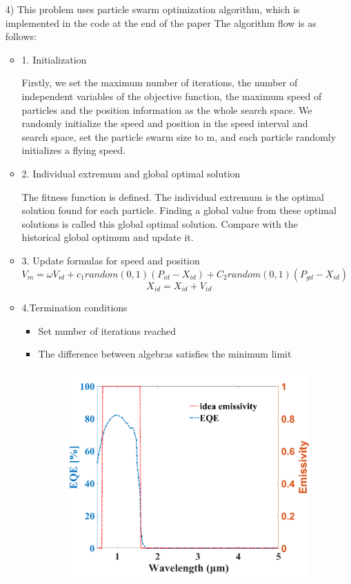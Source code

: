 \documentclass{apmcmthesis}
\begin{document}
\begin{itemize}
\item [4)]This problem uses particle swarm optimization algorithm, which is implemented in the code at the end of the paper
The algorithm flow is as follows:\par
\begin{itemize}
\item 1. Initialization\par
Firstly, we set the maximum number of iterations, the number of independent variables of the objective function, the maximum speed of particles and the position information as the whole search space. We randomly initialize the speed and position in the speed interval and search space, set the particle swarm size to m, and each particle randomly initializes a flying speed.
\item 2. Individual extremum and global optimal solution\par
The fitness function is defined. The individual extremum is the optimal solution found for each particle. Finding a global value from these optimal solutions is called this global optimal solution. Compare with the historical global optimum and update it.
\item 3. Update formulas for speed and position
\[V_{m}=\omega V_{id}+c_{1}random(0,1)(P_{id}-X_{id})+C_{2}random(0,1)(P_{gd}-X_{id})\]
\[X_{id}=X_{id}+V_{id}\]\par
\item 4.Termination conditions\par
\begin{itemize}
\item Set number of iterations reached
\item The difference between algebras satisfies the minimum limit

\begin{figure}[ht]
\centering
\includegraphics[scale=0.3]{figures/7.png}


\end{figure}
\end{itemize}
\end{itemize}
\end{itemize}
\end{document}
